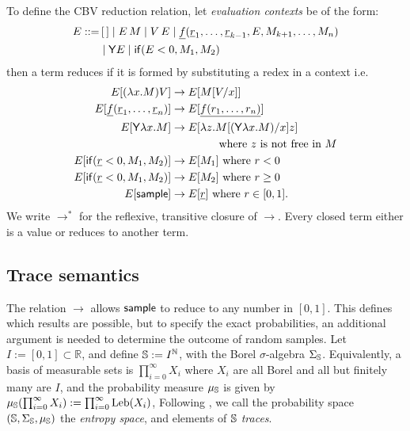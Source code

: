 To define the CBV reduction relation, let \emph{evaluation contexts} be of the form:
\begin{align*}
  E ::= & \, [\,] \mid E \, M \mid V \, E \mid \underline{f}(\underline r_1,\dots ,\underline r_{k-1}, E, M_{k+1}, \dots, M_n) \\ & \mid \mathsf{Y} E \mid \mathsf{if}(E<0, M_1, M_2)
\end{align*}
then a term reduces if it is formed by substituting a redex in a context i.e.
\begin{align*}
  E[(\lambda x.M) V] & \to E[M[V/x]] \\
  E[\underline f (\underline r_1, \dots , \underline r_n)] & \to E[\underline{f(r_1,\dots,r_n)}] \\
  E[\mathsf{Y} \lambda x. M] & \to E[\lambda z. M[(\mathsf{Y} \lambda x. M)/x] z] \\
  & \qquad \qquad \text{ where $z$ is not free in $M$}\\
  E[\mathsf{if}(\underline r < 0, M_1, M_2)] & \to E[M_1] \text{ where }r < 0 \\
  E[\mathsf{if}(\underline r < 0, M_1, M_2)] & \to E[M_2] \text{ where }r \geq 0 \\
  E[\mathsf{sample}] & \to E[\underline r] \text{ where } r \in [0,1].
\end{align*}
We write $\to^\ast$ for the reflexive, transitive closure of $\to$.
Every closed term either is a value or reduces to another term.

\subsection{Trace semantics}
\label{sec:sampling semantics}
The relation $\to$ allows $\mathsf{sample}$ to reduce to any number in $[0,1]$. 
This defines which results are possible, but to specify the exact probabilities, an additional argument is needed to determine the outcome of random samples. Let $ I := [0,1] \subset \mathbb{R} $, and define ${\mathbb{S}} := I^{\mathbb{N}}$, with the Borel $\sigma$-algebra $\Sigma_{\mathbb{S}}$. Equivalently, a basis of measurable sets is $\prod_{i=0}^\infty X_i$ where $X_i$ are all Borel and all but finitely many are $I$, and the probability measure $\mu_{{\mathbb{S}}}$ is given by $\mu_{{\mathbb{S}}} (\prod_{i=0}^\infty X_i) := \prod_{i=0}^\infty \mathrm{Leb}(X_i)$, 
Following \cite{DBLP:conf/esop/CulpepperC17}, we call the probability space $({\mathbb{S}}, \Sigma_{\mathbb{S}}, \mu_{{\mathbb{S}}})$ the \emph{entropy space}, and elements of ${\mathbb{S}}$ \emph{traces}.

